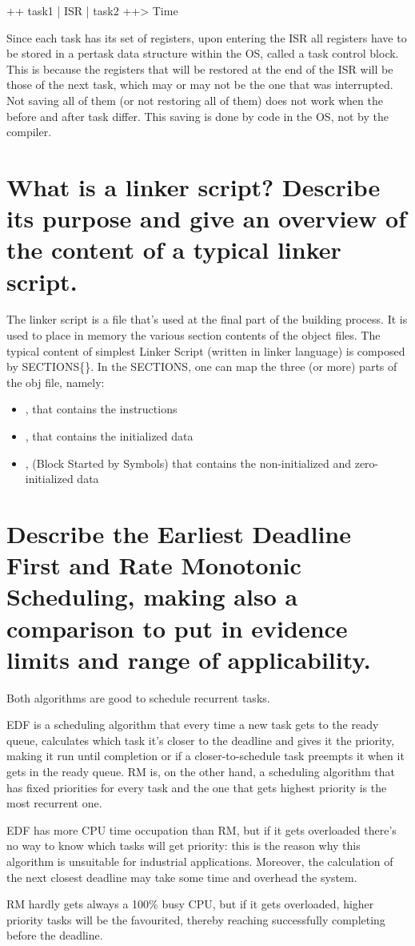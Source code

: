 ++ task1 | ISR | task2 ++> Time


Since each task has its set of registers, upon entering the ISR all registers have to be stored in a per­task data structure within the OS, called a task control block. This is because the registers that will be restored at the end of the ISR will be those of the next task, which may or may not be the one that was interrupted. Not saving all of them (or not restoring all of them) does not work when the before and after task differ. This saving is done by code in the OS, not by the compiler.

\section{What is a linker script? Describe its purpose and give an overview of the content of a typical linker script.}
The linker script is a file that's used at the final part of the building process. It is used to place in memory the various section contents of the object files. 
The typical content of simplest Linker Script (written in linker language) is composed by SECTIONS\{\}.
In the SECTIONS, one can map the three (or more) parts of the obj file, namely:
\begin{itemize}
	\item {}, that contains the instructions
	\item {}, that contains the initialized data
	\item {}, (Block Started by Symbols) that contains the non-initialized and zero-initialized data
\end{itemize}


\section{Describe the Earliest Deadline First and Rate Monotonic Scheduling, making also a comparison to put in evidence limits and range of applicability.}

Both algorithms are good to schedule recurrent tasks.

EDF is a scheduling algorithm that every time a new task gets to the ready queue, calculates which task it's closer to the deadline and gives it the priority, making it run until completion or if a closer-to-schedule task preempts it when it gets in the ready queue. 
RM is, on the other hand, a scheduling algorithm that has fixed priorities for every task and the one that gets highest priority is the most recurrent one.

EDF has more CPU time occupation than RM, but if it gets overloaded there's no way to know which tasks will get priority: this is the reason why this algorithm is unsuitable for industrial applications. Moreover, the calculation of the next closest deadline may take some time and overhead the system.

RM hardly gets always a 100\% busy CPU, but if it gets overloaded, higher priority tasks will be the favourited, thereby reaching successfully completing before the deadline.

